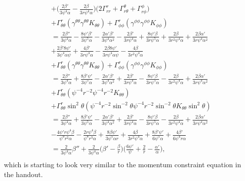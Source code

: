 \documentclass[12pt]{article}
\numberwithin{equation}{section}
\begin{document}
\begin{equation}
\begin{aligned}
&+ \Big( \frac{2 \beta'}{3 \psi^{4} \alpha} - \frac{2 \beta}{3 r \psi^{4} \alpha} \Big) \Big( 2 \Gamma^{r}_{r r} + \Gamma^{\theta}_{r \theta} + \Gamma^{\phi}_{r \phi} \Big) \\
&+ \Gamma^{r}_{\theta \theta} (\gamma^{\theta \theta} \gamma^{\theta \theta} K_{\theta \theta}) + \Gamma^{r}_{\phi \phi} (\gamma^{\phi \phi} \gamma^{\phi \phi} K_{\phi \phi}) \\
&=  \frac{2 \beta''}{3 \psi^{4} \alpha} - \frac{8 \psi' \beta'}{3 \psi^{5} \alpha} - \frac{2 \alpha' \beta'}{3 \psi^{4} \alpha^2} - \frac{2 \beta'}{3 r \psi^{4} \alpha} + \frac{8 \psi' \beta}{3 r \psi^{5} \alpha} + \frac{2 \beta}{3 r^2 \psi^{4} \alpha} + \frac{2 \beta \alpha'}{3 r \psi^{4} \alpha^2}  \\
&+ \frac{2 \beta' 8 \psi'}{3 \psi^{4} \alpha \psi} + \frac{4 \beta'}{3 r \psi^{4} \alpha} - \frac{2 \beta 8 \psi'}{3 r \psi^{4} \alpha \psi} - \frac{4 \beta}{3 r^2 \psi^{4} \alpha} \\
&+ \Gamma^{r}_{\theta \theta} (\gamma^{\theta \theta} \gamma^{\theta \theta} K_{\theta \theta}) + \Gamma^{r}_{\phi \phi} (\gamma^{\phi \phi} \gamma^{\phi \phi} K_{\phi \phi}) \\
&= \frac{2 \beta''}{3 \psi^{4} \alpha} + \frac{8 \beta' \psi'}{3 \psi^{5} \alpha} - \frac{2 \alpha' \beta'}{3 \psi^{4} \alpha^2} + \frac{2 \beta'}{3 r \psi^{4} \alpha} - \frac{8 \psi' \beta}{3 r \psi^{5} \alpha} - \frac{2 \beta}{3 r^2 \psi^{4} \alpha} + \frac{2 \beta \alpha'}{3 r \psi^{4} \alpha^2} \\
&+ \Gamma^{r}_{\theta \theta} (\psi^{-4} r^{-2} \psi^{-4} r^{-2} K_{\theta \theta}) \\
&+ \Gamma^{r}_{\theta \theta} \sin^{2} \theta (\psi^{-4} r^{-2} \sin^{-2} \theta \psi^{-4} r^{-2} \sin^{-2} \theta K_{\theta \theta} \sin^{2} \theta) \\
&= \frac{2 \beta''}{3 \psi^{4} \alpha} + \frac{8 \beta' \psi'}{3 \psi^{5} \alpha} - \frac{2 \alpha' \beta'}{3 \psi^{4} \alpha^2} + \frac{2 \beta'}{3 r \psi^{4} \alpha} - \frac{8 \psi' \beta}{3 r \psi^{5} \alpha} - \frac{2 \beta}{3 r^2 \psi^{4} \alpha} + \frac{2 \beta \alpha'}{3 r \psi^{4} \alpha^2} \\
&- \frac{4 \psi' r \psi^4 \beta}{\psi^{9} r^{2} \alpha} - \frac{2 r \psi^4 \beta}{\psi^{8} r^{3} \alpha} + \frac{8 \beta \psi'}{3 \psi^{5} \alpha r} + \frac{4 \beta}{3 r^2 \psi^{4} \alpha} + \frac{8 \beta' \psi'}{6 \psi^{5} \alpha} + \frac{4 \beta'}{6 \psi^{4} r \alpha} \\
&= \frac{2}{3 \psi^{4} \alpha} \beta'' + \frac{2}{3 \psi^4 \alpha} \Big( \beta' - \frac{\beta}{r} \Big) \Big( \frac{6 \psi'}{\psi} + \frac{2}{r} - \frac{\alpha'}{\alpha} \Big), \\
\end{aligned}
\end{equation}
which is starting to look very similar to the momentum constraint equation in the handout.
\end{document}
